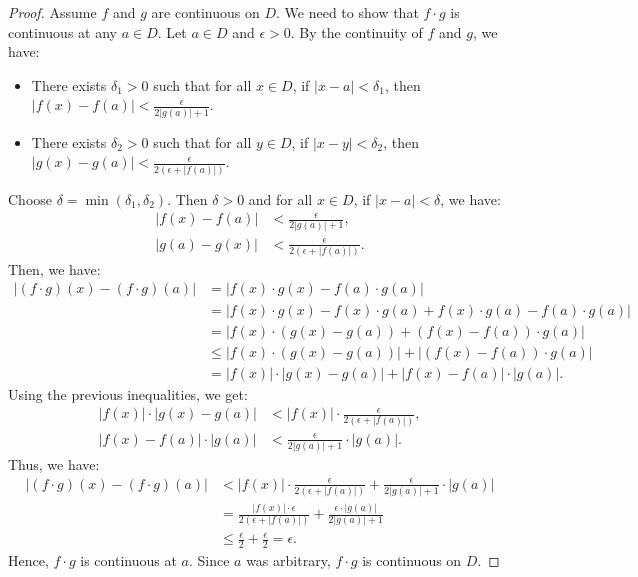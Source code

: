 \begin{proof}
    Assume $f$ and $g$ are continuous on $D$. We need to show that $f \cdot g$ is continuous at any $a \in D$. Let $a \in D$ and $\epsilon > 0$. By the continuity of $f$ and $g$, we have:
    \begin{itemize}
        \item There exists $\delta_1 > 0$ such that for all $x \in D$, if $|x - a| < \delta_1$, then $|f(x) - f(a)| < \frac{\epsilon}{2|g(a)| + 1}$.
        \item There exists $\delta_2 > 0$ such that for all $y \in D$, if $|x - y| < \delta_2$, then $|g(x) - g(a)| < \frac{\epsilon}{2(\epsilon + |f(a)|)}$.
    \end{itemize}
    Choose $\delta = \min(\delta_1, \delta_2)$. Then $\delta > 0$ and for all $x \in D$, if $|x - a| < \delta$, we have:
    \begin{align*}
    |f(x) - f(a)| &< \frac{\epsilon}{2|g(a)| + 1}, \\
    |g(a) - g(x)| &< \frac{\epsilon}{2(\epsilon + |f(a)|)}.
    \end{align*}
    Then, we have:
    \begin{align*}
    |(f \cdot g)(x) - (f \cdot g)(a)| &= |f(x) \cdot g(x) - f(a) \cdot g(a)| \\
    &= |f(x) \cdot g(x) - f(x) \cdot g(a) + f(x) \cdot g(a) - f(a) \cdot g(a)| \\
    &= |f(x) \cdot (g(x) - g(a)) + (f(x) - f(a)) \cdot g(a)| \\
    &\leq |f(x) \cdot (g(x) - g(a))| + |(f(x) - f(a)) \cdot g(a)| \\
    &= |f(x)| \cdot |g(x) - g(a)| + |f(x) - f(a)| \cdot |g(a)|.
    \end{align*}
    Using the previous inequalities, we get:
    \begin{align*}
    |f(x)| \cdot |g(x) - g(a)| &< |f(x)| \cdot \frac{\epsilon}{2(\epsilon + |f(a)|)}, \\
    |f(x) - f(a)| \cdot |g(a)| &< \frac{\epsilon}{2|g(a)| + 1} \cdot |g(a)|.
    \end{align*}
    Thus, we have:
    \begin{align*}
    |(f \cdot g)(x) - (f \cdot g)(a)| &< |f(x)| \cdot \frac{\epsilon}{2(\epsilon + |f(a)|)} + \frac{\epsilon}{2|g(a)| + 1} \cdot |g(a)| \\
    &= \frac{|f(x)| \cdot \epsilon}{2(\epsilon + |f(a)|)} + \frac{\epsilon \cdot |g(a)|}{2|g(a)| + 1} \\
    &\leq \frac{\epsilon}{2} + \frac{\epsilon}{2} = \epsilon.
    \end{align*}
    Hence, $f \cdot g$ is continuous at $a$. Since $a$ was arbitrary, $f \cdot g$ is continuous on $D$.
\end{proof}
